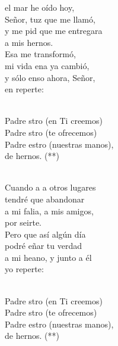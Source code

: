 \begin{cancion}%
	el mar he oído hoy,\\
	Señor, tuz que me llamó,\\
	y me pid que me entregara \\
	a mis hernos.\\
	Esa  me transformó,\\
	mi vida ena ya cambió,\\
	y sólo enso ahora, Señor,\\
	en reperte:\\\jump\\
	\begin{chorus}%
	Padre stro (en Ti creemos)\\
	Padre stro (te ofrecemos)\\
	Padre estro (nuestras manos),\\
	de hernos. (**)\\
	\end{chorus}%
	\jump\\
	Cuando a a otros lugares\\
	tendré que abandonar\\
	a mi falia, a mis amigos,\\
	por seirte.\\
	Pero  que así algún día\\
	podré eñar tu verdad\\
	a mi heano, y junto a él\\
	yo reperte:\\\jump\\
	\begin{chorus}%
	Padre stro (en Ti creemos)\\
	Padre stro (te ofrecemos)\\
	Padre estro (nuestras manos),\\
	de hernos. (**)\\
	\end{chorus}%
	\jump\\
\end{cancion}%
